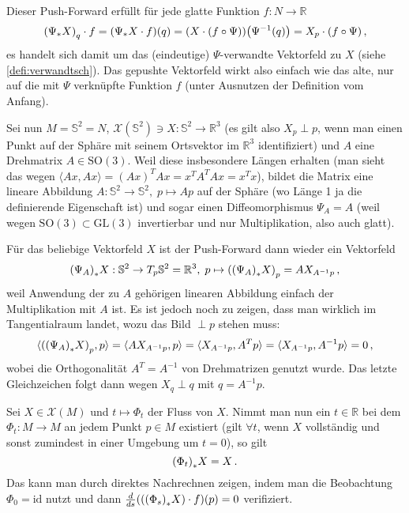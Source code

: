 \documentclass[../H_Analysis_main.tex]{subfiles}
\begin{document}
Dieser Push-Forward erfüllt für jede glatte Funktion $f: N \rightarrow \mathbb{R}$
\begin{equation}
\qty(\Psi_* X)_q \cdot f = \qty(\Psi_* X \cdot f)(q) = \qty(X \cdot \qty(f \circ \Psi))\qty(\Psi^{-1}(q)) = X_p \cdot \qty(f \circ \Psi) \, ,
\end{equation}
es handelt sich damit um das (eindeutige) $\Psi$-verwandte Vektorfeld zu $X$ (siehe \ref{defi:verwandtsch}). Das gepushte Vektorfeld wirkt also einfach wie das alte, nur auf die mit $\Psi$ verknüpfte Funktion $f$ (unter Ausnutzen der Definition vom Anfang).

\begin{bsp}
Sei nun $M = \mathbb{S}^2 = N$, $\mathcal{X}(\mathbb{S}^2) \ni X: \mathbb{S}^2 \rightarrow \mathbb{R}^3$ (es gilt also $X_p \perp p$, wenn man einen Punkt auf der Sphäre mit seinem Ortsvektor im $\mathbb{R}^3$ identifiziert) und $A$ eine Drehmatrix $A \in \text{SO}(3)$. Weil diese insbesondere Längen erhalten (man sieht das wegen $\langle A x, A x \rangle = (Ax)^T Ax = x^T A^T A x = x^T x$), bildet die Matrix eine lineare Abbildung $A: \mathbb{S}^2 \rightarrow \mathbb{S}^2, \; p \mapsto A p$ auf der Sphäre (wo Länge 1 ja die definierende Eigenschaft ist) und sogar einen Diffeomorphismus $\Psi_A = A$ (weil wegen $\text{SO}(3) \subset \text{GL}(3)$ invertierbar und nur Multiplikation, also auch glatt).

Für das beliebige Vektorfeld $X$ ist der Push-Forward dann wieder ein Vektorfeld
\begin{equation}
\qty(\Psi_A)_* X: \mathbb{S}^2 \rightarrow T_p \mathbb{S}^2 = \mathbb{R}^3, \; p \mapsto \qty(\qty(\Psi_A)_* X)_p = A X_{A^{-1}p} \, ,
\end{equation}
weil Anwendung der zu $A$ gehörigen linearen Abbildung einfach der Multiplikation mit $A$ ist. Es ist jedoch noch zu zeigen, dass man wirklich im Tangentialraum landet, wozu das Bild $\perp p$ stehen muss:
\begin{equation*}
\langle \qty(\qty(\Psi_A)_* X)_p, p \rangle = \langle A X_{A^{-1}p}, p \rangle = \langle X_{A^{-1}p}, A^T p \rangle = \langle X_{A^{-1}p}, A^{-1} p \rangle = 0 \, ,
\end{equation*}
wobei die Orthogonalität $A^T = A^{-1}$ von Drehmatrizen genutzt wurde. Das letzte Gleichzeichen folgt dann wegen $X_q \perp q$ mit $q = A^{-1} p$.
\end{bsp}


\begin{bsp}\label{bsp:flusspush}
Sei $X \in \mathcal{X}(M)$ und $t \mapsto \Phi_t$ der Fluss von $X$. Nimmt man nun ein $t \in \mathbb{R}$ bei dem $\Phi_t: M \rightarrow M$ an jedem Punkt $p \in M$ existiert (gilt $\forall t$, wenn $X$ vollständig und sonst zumindest in einer Umgebung um $t = 0$), so gilt
\begin{equation}
\qty(\Phi_t)_* X = X \, .
\end{equation}
Das kann man durch direktes Nachrechnen zeigen, indem man die Beobachtung $\Phi_0 = \text{id}$ nutzt und dann $\dv{s} \qty(\qty(\qty(\Phi_s)_* X) \cdot f)(p) = 0$ verifiziert.
\end{bsp}
\end{document}
